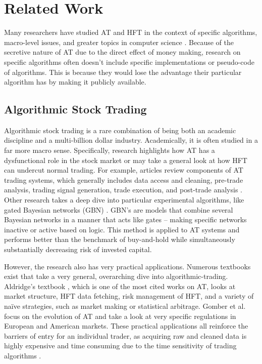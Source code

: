 \documentclass[../thesis.tex]{subfiles}
\begin{document}
\chapter{Related Work}
\label{ch:relatedwork}

Many researchers have studied AT and HFT in the context of specific algorithms, macro-level issues, and greater topics in computer science \cite{Treleaven2013}. Because of the secretive nature of AT due to the direct effect of money making, research on specific algorithms often doesn't include specific implementations or pseudo-code of algorithms. This is because they would lose the advantage their particular algorithm has by making it publicly available. 

\section{Algorithmic Stock Trading}

Algorithmic stock trading is a rare combination of being both an academic discipline and a multi-billion dollar industry. Academically, it is often studied in a far more macro sense. Specifically, research highlights how AT has a dysfunctional role in the stock market or may take a general look at how HFT can undercut normal trading.  For example, articles review components of AT trading systems, which generally includes data access and cleaning, pre-trade analysis, trading signal generation, trade execution, and post-trade analysis \cite{Treleaven2013}. Other research takes a deep dive into particular experimental algorithms, like gated Bayesian networks (GBN) \cite{Bendtsen2016}. GBN's are models that combine several Bayesian networks in a manner that acts like gates -- making specific networks inactive or active based on logic. This method is applied to AT systems and performs better than the benchmark of buy-and-hold while simultaneously substantially decreasing risk of invested capital. 

However, the research also has very practical applications. Numerous textbooks exist that take a very general, overarching dive into algorithmic-trading. Aldridge's textbook \cite{Aldridge2010}, which is one of the most cited works on AT, looks at market structure, HFT data fetching, risk management of HFT, and a variety of na\"{i}ve strategies, such as market making or statistical arbitrage. Gomber et al. \cite{Gomber2011} focus on the evolution of AT and take a look at very specific regulations in European and American markets. These practical applications all reinforce the barriers of entry for an individual trader, as acquiring raw and cleaned data is highly expensive and time consuming due to the time sensitivity of trading algorithms \cite{Treleaven2013}. 
\end{document}
